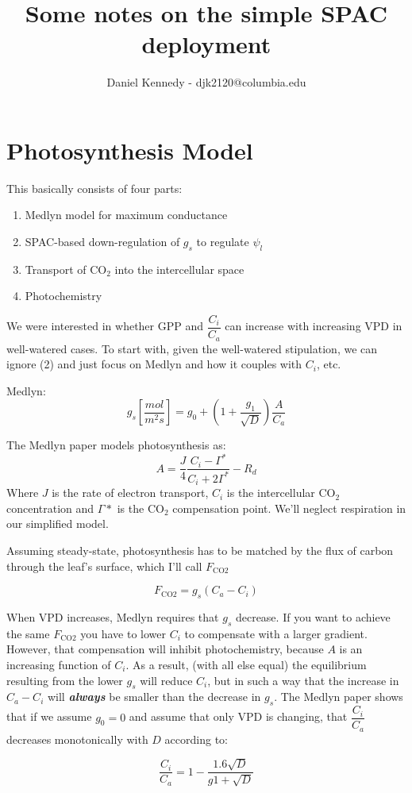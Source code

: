 \documentclass[11pt]{article}
\title{Some notes on the simple SPAC deployment \large }
\author{Daniel Kennedy - djk2120@columbia.edu}
\begin{document}
\maketitle

\section{Photosynthesis Model}
This basically consists of four parts:
\begin{enumerate}
\item Medlyn model for maximum conductance
\item SPAC-based down-regulation of $g_s$ to regulate $\psi_l$
\item Transport of CO$_2$ into the intercellular space
\item Photochemistry
\end{enumerate}

We were interested in whether GPP and $\dfrac{C_i}{C_a}$ can increase with increasing VPD in well-watered cases. To start with, given the well-watered stipulation, we can ignore (2) and just focus on Medlyn and how it couples with $C_i$, etc.

Medlyn:
\begin{equation}
g_{s}\left[\dfrac{mol}{m^2s}\right] =  g_0+\left(1+\dfrac{g_1}{\sqrt{D}}\right)\dfrac{A}{C_a}
\end{equation}

The Medlyn paper models photosynthesis as:
\begin{equation}
A = \dfrac{J}{4}\dfrac{C_i-\Gamma^*}{C_i+2\Gamma^*}-R_d
\end{equation}
Where $J$ is the rate of electron transport, $C_i$ is the intercellular CO$_2$ concentration and $\Gamma *$ is the CO$_2$ compensation point. We'll neglect respiration in our simplified model.

Assuming steady-state, photosynthesis has to be matched by the flux of carbon through the leaf's surface, which I'll call $F_{\text{CO}2}$

\begin{equation}
F_{\text{CO}2} = g_s\left(C_a-C_i\right)
\end{equation}

When VPD increases, Medlyn requires that $g_s$ decrease. If you want to achieve the same $F_{\text{CO}2}$ you have to lower $C_i$ to compensate with a larger gradient. However, that compensation will inhibit photochemistry, because $A$ is an increasing function of $C_i$. As a result, (with all else equal) the equilibrium resulting from the lower $g_s$ will reduce $C_i$, but in such a way that the increase in $C_a-C_i$ will \textbf{\textit{always}} be smaller than the decrease in $g_s$. The Medlyn paper shows that if we assume $g_0=0$ and assume that only VPD is changing, that $\dfrac{C_i}{C_a}$ decreases monotonically with $D$ according to:

\begin{equation}
\dfrac{C_i}{C_a} = 1-\dfrac{1.6\sqrt{D}}{g1+\sqrt{D}}
\end{equation}
\end{document}
